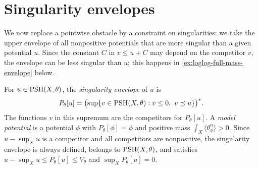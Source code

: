





\section{Singularity envelopes}
\label{sec:singularity-envelopes}
We now replace a pointwise obstacle by a constraint on singularities: we take the upper envelope of all nonpositive potentials that are more singular than a given potential $u$. Since the constant $C$ in $v\leq u+C$ may depend on the competitor $v$, the envelope can be less singular than $u$; this happens in \cref{ex:loglog-full-mass-envelope} below.

\begin{definition}\label{def:singularity-p-envelope}
For $u\in\mathrm{PSH}(X,\theta)$, the \emph{singularity envelope} of $u$ is
\[
 P_\theta[u]=\bigl(\sup\{v\in\mathrm{PSH}(X,\theta):v\leq0,
                                                   \ v\preceq u\}\bigr)^*.
\]
The functions $v$ in this supremum are the competitors for $P_\theta[u]$. A \emph{model potential} is a potential $\phi$ with $P_\theta[\phi]=\phi$ and positive mass $\int_X\langle\theta_\phi^n\rangle>0$. Since $u-\sup_Xu$ is a competitor and all competitors are nonpositive, the singularity envelope is always defined, belongs to $\mathrm{PSH}(X,\theta)$, and satisfies $u-\sup_Xu\leq P_\theta[u]\leq V_\theta$ and $\sup_XP_\theta[u]=0$.
\end{definition}

